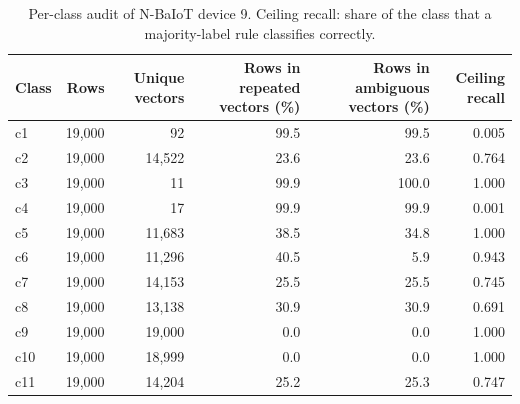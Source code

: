 \begin{table}[t]
\centering
\caption{Per-class audit of N-BaIoT device 9. Ceiling recall: share of the class that a majority-label rule classifies correctly.}
\label{tab:ambclass}
\scriptsize
\setlength{\tabcolsep}{3pt}
\begin{tabular}{@{}lrrrrr@{}}
\toprule
Class & Rows & Unique vectors & Rows in repeated vectors (\%) & Rows in ambiguous vectors (\%) & Ceiling recall \\
\midrule
c1 & 19,000 & 92 & 99.5 & 99.5 & 0.005 \\
c2 & 19,000 & 14,522 & 23.6 & 23.6 & 0.764 \\
c3 & 19,000 & 11 & 99.9 & 100.0 & 1.000 \\
c4 & 19,000 & 17 & 99.9 & 99.9 & 0.001 \\
c5 & 19,000 & 11,683 & 38.5 & 34.8 & 1.000 \\
c6 & 19,000 & 11,296 & 40.5 & 5.9 & 0.943 \\
c7 & 19,000 & 14,153 & 25.5 & 25.5 & 0.745 \\
c8 & 19,000 & 13,138 & 30.9 & 30.9 & 0.691 \\
c9 & 19,000 & 19,000 & 0.0 & 0.0 & 1.000 \\
c10 & 19,000 & 18,999 & 0.0 & 0.0 & 1.000 \\
c11 & 19,000 & 14,204 & 25.2 & 25.3 & 0.747 \\
\bottomrule
\end{tabular}
\end{table}
